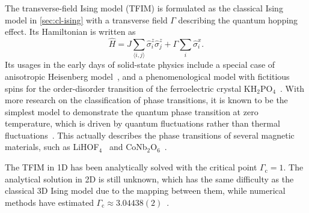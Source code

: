 The transverse-field Ising model (TFIM) is formulated as the classical Ising model in \cref{sec:cl-ising} with a transverse field $\Gamma$ describing the quantum hopping effect. Its Hamiltonian is written as
\begin{equation}
\hat{H} = J \sum_{\langle i, j \rangle} \hat{\sigma}^z_i \hat{\sigma}^z_j
+ \Gamma \sum_i \hat{\sigma}^x_i.
\label{eq:qu-ising}
\end{equation}
Its usages in the early days of solid-state physics include a special case of anisotropic Heisenberg model~\cite{katsura1962statistical}, and a phenomenological model with fictitious spins for the order-disorder transition of the ferroelectric crystal KH$_2$PO$_4$~\cite{de1963collective}. With more research on the classification of phase transitions, it is known to be the simplest model to demonstrate the quantum phase transition at zero temperature, which is driven by quantum fluctuations rather than thermal fluctuations~\cite{sachdev2001quantum, suzuki2013quantum}. This actually describes the phase transitions of several magnetic materials, such as LiHOF$_4$~\cite{bitko1996quantum} and CoNb$_2$O$_6$~\cite{coldea2010quantum}.

The TFIM in 1D has been analytically solved with the critical point $\Gamma_\text{c} = 1$. The analytical solution in 2D is still unknown, which has the same difficulty as the classical 3D Ising model due to the mapping between them, while numerical methods have estimated $\Gamma_\text{c} \approx 3.04438(2)$~\cite{blote2002cluster}.

%
